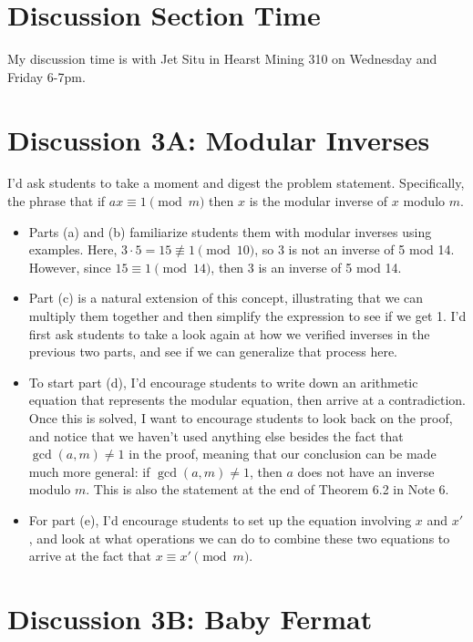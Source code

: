 \documentclass[10pt]{article}
\begin{document}
    \section*{Discussion Section Time}
    My discussion time is with Jet Situ in Hearst Mining 310 on Wednesday and Friday 6-7pm.

    \section*{Discussion 3A: Modular Inverses}

    I'd ask students to take a moment and digest the problem statement. Specifically, the phrase that if $ax \equiv 1 \pmod m$ then $x$ is the modular inverse of $x$ modulo $m$. 
    \begin{itemize}[label={--}]
        \item Parts (a) and (b) familiarize students them with modular inverses using examples. Here, $3 \cdot 5 = 15 \not \equiv 1 \pmod{10}$, so $3$ is not an inverse of 5 mod 14. However, since $15 \equiv 1 \pmod{14}$, then 3 is an inverse of 5 mod 14.
        \item Part (c) is a natural extension of this concept, illustrating that we can multiply them together and then simplify the expression to see if we get 1. I'd first ask students to take a look again at how we verified inverses in the previous two parts, and see if we can generalize that process here.
        \item  To start part (d), I'd encourage students to write down an arithmetic equation that represents the modular equation, then arrive at a contradiction. Once this is solved, I want to encourage students to look back on the proof, and notice that we haven't used anything else besides the fact that $\gcd(a, m) \neq 1$ in the proof, meaning that our conclusion can be made much more general: if $\gcd(a, m) \neq 1$, then $a$ does not have an inverse modulo $m$. This is also the statement at the end of Theorem 6.2 in Note 6.
        \item For part (e), I'd encourage students to set up the equation involving $x$ and $x'$, and look at what operations we can do to combine these two equations to arrive at the fact that $x \equiv x' \pmod m$.
    \end{itemize} 


    \pagebreak

    \section*{Discussion 3B: Baby Fermat}
\end{document}
